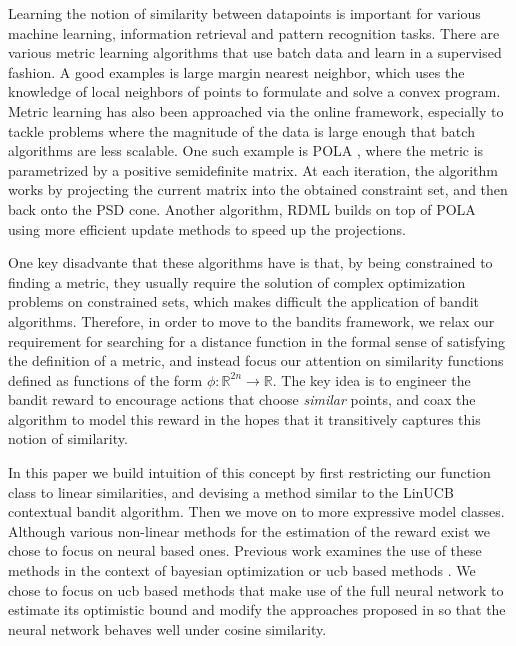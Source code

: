 \documentclass{article}
\begin{document}
Learning the notion of similarity between datapoints is important for various machine learning, information retrieval and pattern recognition tasks.
There are various metric learning algorithms that use batch data and learn in a supervised fashion.\cite{metric-learning}
A good examples is large margin nearest neighbor, which uses the knowledge of local neighbors of points to formulate and solve a convex program.\cite{understanding-machine-learning}
Metric learning has also been approached via the online framework, especially to tackle problems where the magnitude of the data is large enough that batch algorithms are less scalable.
One such example is POLA \cite{pola}, where the metric is parametrized by a positive semidefinite matrix.
At each iteration, the algorithm works by projecting the current matrix into the obtained constraint set, and then back onto the PSD cone.
Another algorithm, RDML \cite{rdml} builds on top of POLA using more efficient update methods to speed up the projections.

One key disadvante that these algorithms have is that, by being constrained to finding a metric, they usually require the solution of complex optimization problems on constrained sets,
which makes difficult the application of bandit algorithms.
Therefore, in order to move to the bandits framework, we relax our requirement for searching for a distance function in the formal sense of satisfying the definition of a metric, and instead focus our attention on similarity functions defined as functions of the form $\phi: \mathbb{R}^{2n} \to \mathbb{R}$.
The key idea is to engineer the bandit reward to encourage actions that choose \textit{similar} points, and coax the algorithm to model this reward in the hopes that it transitively captures this notion of similarity.

In this paper we build intuition of this concept by first restricting our function class to linear similarities, and devising a method similar to the LinUCB contextual bandit algorithm\cite{linucb}.
Then we move on to more expressive model classes.
Although various non-linear methods for the estimation of the reward exist we chose to focus on neural based ones.
Previous work examines the use of these methods in the context of bayesian optimization \cite{deep-bayesian-bandits-show-down} or ucb based methods \cite{neuralucb}\cite{shallow}.
We chose to focus on ucb based methods that make use of the full neural network to estimate its optimistic bound and modify the approaches proposed in \cite{neuralucb}
so that the neural network behaves well under cosine similarity.
\end{document}
